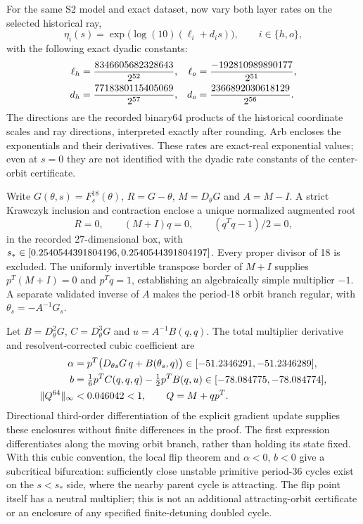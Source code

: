 \documentclass[11pt,letterpaper]{article}
\begin{document}
For the same S2 model and exact dataset, now vary both layer rates on the selected historical ray,
\begin{equation}
\eta_i(s)=\exp\!\bigl(\log(10)(\ell_i+d_i s)\bigr),\qquad i\in\{h,o\},
\end{equation}
with the following exact dyadic constants:
\begin{equation}
\begin{aligned}
\ell_h&=\frac{8346605682328643}{2^{52}},&\ell_o&=\frac{-192810989890177}{2^{51}},\\
d_h&=\frac{7718380115405069}{2^{57}},&d_o&=\frac{2366892030618129}{2^{56}}.
\end{aligned}
\end{equation}
The directions are the recorded binary64 products of the historical coordinate scales and ray directions,
interpreted exactly after rounding. Arb encloses the exponentials and their derivatives. These rates are
exact-real exponential values; even at $s=0$ they are not identified with the dyadic rate constants of the
center-orbit certificate.

Write $G(\theta,s)=F_s^{18}(\theta)$, $R=G-\theta$, $M=D_\theta G$ and $A=M-I$.
A strict Krawczyk inclusion and contraction enclose a unique normalized augmented root
\begin{equation}
R=0,\qquad (M+I)q=0,\qquad (q^Tq-1)/2=0,
\end{equation}
in the recorded 27-dimensional box, with $s_*\in[0.2540544391804196, 0.2540544391804197]$. Every proper divisor of 18 is excluded.
The uniformly invertible transpose border of $M+I$ supplies $p^T(M+I)=0$ and $p^Tq=1$,
establishing an algebraically simple multiplier $-1$. A separate validated inverse of $A$ makes the
period-18 orbit branch regular, with $\theta_s=-A^{-1}G_s$.

Let $B=D_\theta^2G$, $C=D_\theta^3G$ and $u=A^{-1}B(q,q)$. The total multiplier derivative and
resolvent-corrected cubic coefficient are
\begin{equation}
\begin{aligned}
\alpha&=p^T\bigl(D_{\theta s}G\,q+B(\theta_s,q)\bigr)\in[-51.2346291, -51.2346289],\\
b&=\tfrac16 p^TC(q,q,q)-\tfrac12 p^TB(q,u)\in[-78.084775, -78.084774],\\
\|Q^{64}\|_\infty&<0.046042<1,\qquad Q=M+qp^T.
\end{aligned}
\end{equation}
Directional third-order differentiation of the explicit gradient update supplies these enclosures without
finite differences in the proof. The first expression differentiates along the moving orbit branch, rather
than holding its state fixed. With this cubic convention, the local flip theorem \citep{kuznetsov2019}
and $\alpha<0$, $b<0$ give a subcritical bifurcation: sufficiently close unstable primitive period-36
cycles exist on the $s<s_*$ side, where the nearby parent cycle is attracting. The flip point itself has a
neutral multiplier; this is not an additional attracting-orbit certificate or an enclosure of any specified
finite-detuning doubled cycle.
\end{document}
